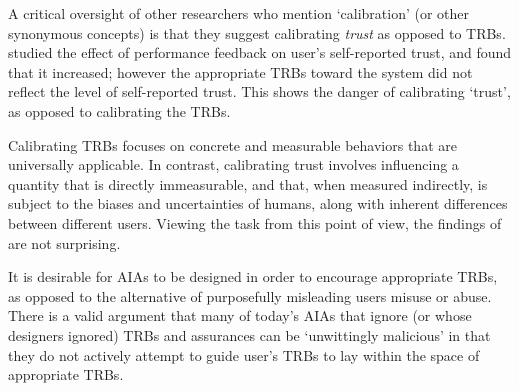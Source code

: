     A critical oversight of other researchers who mention `calibration' (or other synonymous concepts) is that they suggest calibrating \emph{trust} as opposed to TRBs. \citet{Dzindolet2003-ts} studied the effect of performance feedback on user's self-reported trust, and found that it increased; however the appropriate TRBs toward the system did not reflect the level of self-reported trust. This shows the danger of calibrating `trust', as opposed to calibrating the TRBs.

    Calibrating TRBs focuses on concrete and measurable behaviors that are universally applicable. In contrast, calibrating trust involves influencing a quantity that is directly immeasurable, and that, when measured indirectly, is subject to the biases and uncertainties of humans, along with inherent differences between different users. Viewing the task from this point of view, the findings of \citeauthor{Dzindolet2003-ts} are not surprising.

    It is desirable for AIAs to be designed in order to encourage appropriate TRBs, as opposed to the alternative of purposefully misleading users misuse or abuse. There is a valid argument that many of today's AIAs that ignore (or whose designers ignored) TRBs and assurances can be `unwittingly malicious' in that they do not actively attempt to guide user's TRBs to lay within the space of appropriate TRBs.

